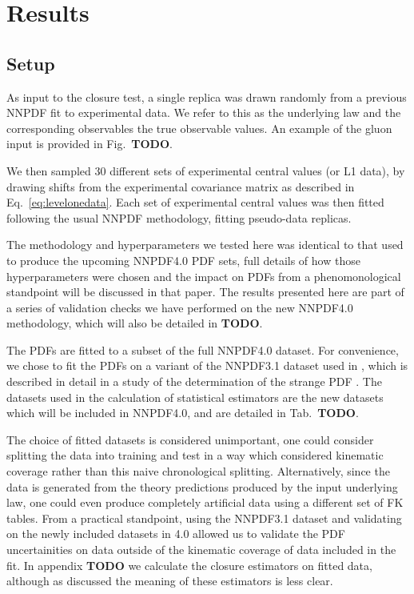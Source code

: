 \section{Results}

\subsection{Setup}

As input to the closure test, a single replica was drawn randomly from
a previous NNPDF fit to experimental data. We refer to this as the underlying
law and the corresponding observables the true observable values. An example
of the gluon input is provided in Fig.~{\bf TODO}.


We then sampled 30 different sets of experimental central values (or L1 data),
by drawing
shifts from the experimental covariance matrix as described in
Eq.~\ref{eq:levelonedata}. Each set of experimental central values was then
fitted following the usual NNPDF methodology, fitting pseudo-data replicas.

The methodology and hyperparameters we tested here was identical to that used
to produce the upcoming NNPDF4.0 PDF sets, full details of how those hyperparameters
were chosen and the impact on PDFs from a phenomonological standpoint will be
discussed in that paper. %
The results presented here are part of a series of validation checks we have performed
on the new NNPDF4.0 methodology, which will also be detailed in {\bf TODO}.

The PDFs are fitted to a subset of the full NNPDF4.0 dataset. For convenience,
we chose to fit the PDFs on a variant of the NNPDF3.1 dataset used in
\cite{Ball_2018}, which is described in detail in a study of the determination
of the strange PDF \cite{Faura_2020}. The datasets used in the calculation of
statistical estimators are the new datasets which will be included in NNPDF4.0,
and are detailed in Tab.~{\bf TODO}.

The choice of fitted datasets is
considered unimportant, one could consider splitting the data into training
and test in a way which considered kinematic coverage rather than this
naive chronological splitting. Alternatively, since the data is generated from
the theory predictions produced by the input underlying law, one could even
produce completely artificial data using a different set of FK tables. From a
practical standpoint, using the NNPDF3.1 dataset and validating on the newly included
datasets in 4.0 allowed us to validate the PDF uncertainities on data outside
of the kinematic coverage of data included in the fit. In appendix {\bf TODO}
we calculate the closure estimators on fitted data, although as discussed the
meaning of these estimators is less clear.

